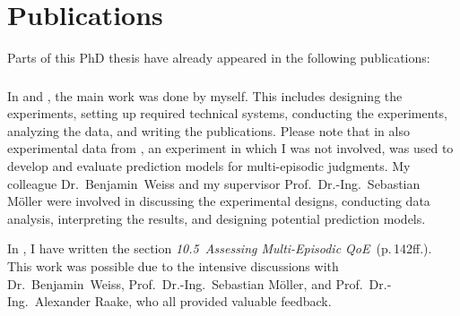 \chapter*{Publications}
Parts of this PhD thesis have already appeared in the following publications:

\begin{refsection}
    \small
    \nocite{guse_macro-temporal_2013}
    \nocite{guse_modelling_2014}
    \nocite{weiss_temporal_2014}
    \printbibliography[heading=none]
\end{refsection}

\subsection*{}
In \citet{guse_macro-temporal_2013} and \citet{guse_modelling_2014}, the main work was done by myself.
This includes designing the experiments, setting up required technical systems, conducting the experiments, analyzing the data, and writing the publications.
Please note that in \citet{guse_modelling_2014} also experimental data from \citet{moller_single-call_2011}, an experiment in which I was not involved, was used to develop and evaluate prediction models for multi-episodic judgments.
My colleague Dr.~Benjamin~Weiss and my supervisor Prof.~Dr.-Ing.~Sebastian Möller were involved in discussing the experimental designs, conducting data analysis, interpreting the results, and designing potential prediction models.

In \citet{weiss_temporal_2014}, I have written the section \emph{10.5~Assessing Multi-Episodic QoE}~(p.\,142ff.).
This work was possible due to the intensive discussions with Dr.~Benjamin~Weiss, Prof.~Dr.-Ing.~Sebastian Möller, and Prof.~Dr.-Ing.~Alexander Raake, who all provided valuable feedback.